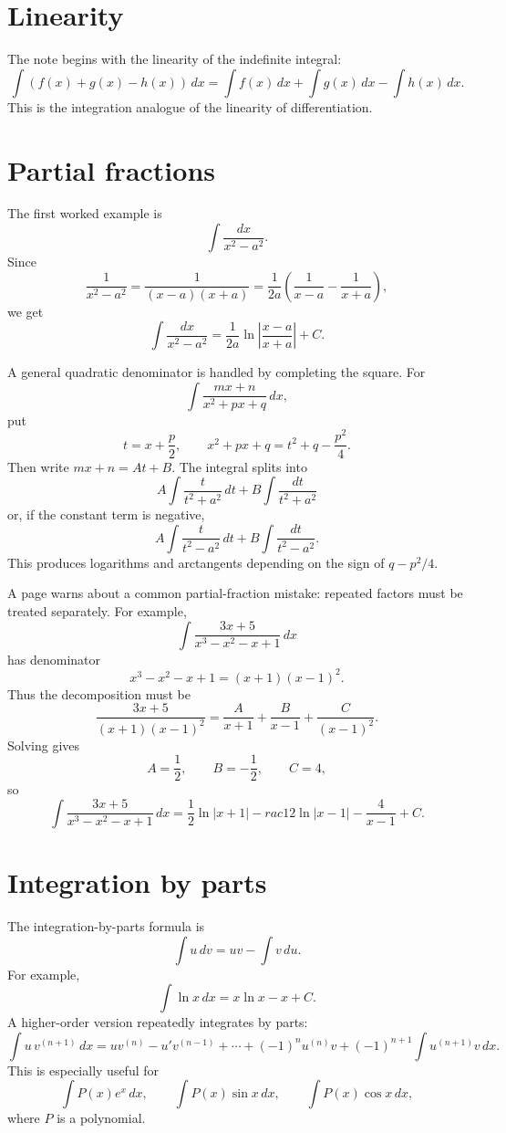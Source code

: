 
\section{Linearity}

The note begins with the linearity of the indefinite integral:
\[
  \int (f(x)+g(x)-h(x))\,dx
  =\int f(x)\,dx+\int g(x)\,dx-\int h(x)\,dx.
\]
This is the integration analogue of the linearity of differentiation.

\section{Partial fractions}

The first worked example is
\[
  \int\frac{dx}{x^2-a^2}.
\]
Since
\[
  \frac1{x^2-a^2}=\frac1{(x-a)(x+a)}
  =\frac1{2a}\left(\frac1{x-a}-\frac1{x+a}\right),
\]
we get
\[
  \int\frac{dx}{x^2-a^2}
  =\frac1{2a}\ln\left|\frac{x-a}{x+a}\right|+C.
\]

A general quadratic denominator is handled by completing the square.  For
\[
  \int\frac{mx+n}{x^2+px+q}\,dx,
\]
put
\[
  t=x+\frac p2,\qquad x^2+px+q=t^2+q-\frac{p^2}{4}.
\]
Then write \(mx+n=At+B\).  The integral splits into
\[
  A\int\frac{t}{t^2+a^2}\,dt+B\int\frac{dt}{t^2+a^2}
\]
or, if the constant term is negative,
\[
  A\int\frac{t}{t^2-a^2}\,dt+B\int\frac{dt}{t^2-a^2}.
\]
This produces logarithms and arctangents depending on the sign of \(q-p^2/4\).

A page warns about a common partial-fraction mistake: repeated factors must be treated separately.  For example,
\[
  \int\frac{3x+5}{x^3-x^2-x+1}\,dx
\]
has denominator
\[
  x^3-x^2-x+1=(x+1)(x-1)^2.
\]
Thus the decomposition must be
\[
  \frac{3x+5}{(x+1)(x-1)^2}
  =
  \frac{A}{x+1}+\frac{B}{x-1}+\frac{C}{(x-1)^2}.
\]
Solving gives
\[
  A=\frac12,\qquad B=-\frac12,\qquad C=4,
\]
so
\[
  \int\frac{3x+5}{x^3-x^2-x+1}\,dx
  =
  \frac12\ln|x+1|-
rac12\ln|x-1|-\frac4{x-1}+C.
\]

\section{Integration by parts}

The integration-by-parts formula is
\[
  \int u\,dv=uv-\int v\,du.
\]
For example,
\[
  \int \ln x\,dx=x\ln x-x+C.
\]
A higher-order version repeatedly integrates by parts:
\[
  \int u\,v^{(n+1)}\,dx
  =
  u v^{(n)}-u'v^{(n-1)}+\cdots+(-1)^n u^{(n)}v
  +(-1)^{n+1}\int u^{(n+1)}v\,dx.
\]
This is especially useful for
\[
  \int P(x)e^x\,dx,\qquad
  \int P(x)\sin x\,dx,\qquad
  \int P(x)\cos x\,dx,
\]
where \(P\) is a polynomial.

